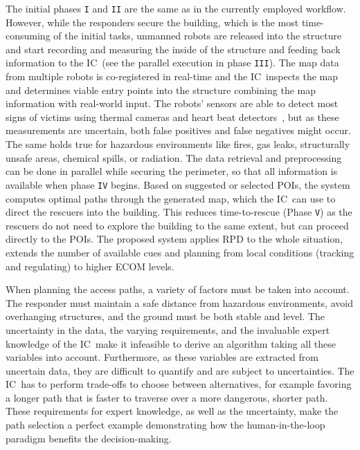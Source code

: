 \documentclass[review,journal]{vgtc}         %
\def\IC{IC}
\begin{document}
 The initial phases \texttt{I} and \texttt{II} are the same as in the currently employed workflow. However, while the responders secure the building, which is the most time-consuming of the initial tasks, unmanned robots are released into the structure and start recording and measuring the inside of the structure and feeding back information to the \IC\ (see the parallel execution in phase \texttt{III}). The map data from multiple robots is co-registered in real-time and the \IC\ inspects the map and determines viable entry points into the structure combining the map information with real-world input. The robots' sensors are able to detect most signs of victims using thermal cameras and heart beat detectors~\cite{6027084, Wu12Eulerian}, but as these measurements are uncertain, both false positives and false negatives might occur. The same holds true for hazardous environments like fires, gas leaks, structurally unsafe areas, chemical spills, or radiation. The data retrieval and preprocessing can be done in parallel while securing the perimeter, so that all information is available when phase \texttt{IV} begins. Based on suggested or selected POIs, the system computes optimal paths through the generated map, which the \IC\ can use to direct the rescuers into the building. This reduces time-to-rescue (Phase \texttt{V}) as the rescuers do not need to explore the building to the same extent, but can proceed directly to the POIs. The proposed system applies RPD to the whole situation, extends the number of available cues and planning from local conditions (tracking and regulating) to higher ECOM levels.

When planning the access paths, a variety of factors must be taken into account. The responder must maintain a safe distance from hazardous environments, avoid overhanging structures, and the ground must be both stable and level. The uncertainty in the data, the varying requirements, and the invaluable expert knowledge of the \IC\ make it infeasible to derive an algorithm taking all these variables into account. Furthermore, as these variables are extracted from uncertain data, they are difficult to quantify and are subject to uncertainties. The \IC\ has to perform trade-offs to choose between alternatives, for example favoring a longer path that is faster to traverse over a more dangerous, shorter path. These requirements for expert knowledge, as well as the uncertainty, make the path selection a perfect example demonstrating how the human-in-the-loop paradigm benefits the decision-making.
\end{document}
